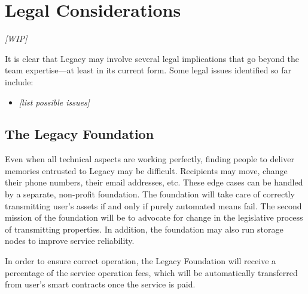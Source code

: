 \chapter{Legal Considerations} %
\label{cha:legal_considerations}

\textit{[WIP]}

It is clear that Legacy may involve several legal implications that go beyond the team expertise---at least in its current form. Some legal issues identified so far include:

\begin{itemize}
	\item \textit{[list possible issues]}
\end{itemize}


\section{The Legacy Foundation} %
\label{sec:the_legacy_foundation}

Even when all technical aspects are working perfectly, finding people to deliver memories entrusted to Legacy may be difficult. Recipients may move, change their phone numbers, their email addresses, etc. These edge cases can be handled by a separate, non-profit foundation.
The foundation will take care of correctly transmitting user’s assets if and only if purely automated means fail. 
The second mission of the foundation will be to advocate for change in the legislative process of transmitting properties.
In addition, the foundation may also run storage nodes to improve service reliability.

In order to ensure correct operation, the Legacy Foundation will receive a percentage of the service operation fees, which will be automatically transferred from user’s smart contracts once the service is paid.



